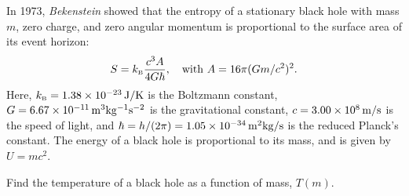 \bigskip {}
In 1973, {\sl Bekenstein} showed that
the entropy of a stationary black hole with mass $m$,
zero charge, and zero angular momentum is proportional
to the surface area of its event horizon:
\[
S = k_{\rm\scriptscriptstyle B} \frac{c^3 A}{4 G \hbar},\quad {\rm with\ } A = 16 \pi (Gm/c^2)^2 .
\]
Here,
$k_{\rm\scriptscriptstyle B} = \rm 1.38\times10^{-23}\, J/K$ is the Boltzmann constant,
$G = \rm 6.67\times 10^{-11}\, m^3 kg^{-1} s^{-2}$
is the gravitational constant,
$c = \rm 3.00\times 10^8\, m/s$ is the speed of light,
and $\hbar = h/(2\pi) = \rm 1.05\times 10^{-34}\, m^2 kg/s$
is the reduced Planck's constant.
The energy of a black hole is proportional to its mass,
and is given by $U = m c^2$.

\smallskip \subp
Find the temperature of a black hole
as a function of mass, $T(m)$.


